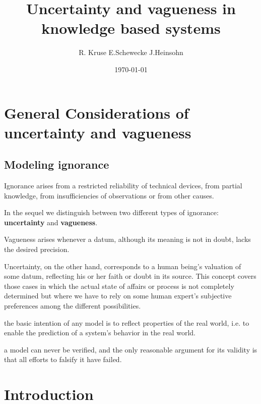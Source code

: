 \documentclass[11pt]{article}
\author{R. Kruse E.Schewecke J.Heinsohn}
\date{\today}
\title{Uncertainty and vagueness in knowledge based systems}
\begin{document}
\maketitle
\tableofcontents \clearpage\section{General Considerations of uncertainty and vagueness}
\label{sec:orgabc4af6}
\subsection{Modeling ignorance}
\label{sec:orgb9a4f31}
Ignorance arises from a restricted reliability of technical devices, from
partial knowledge, from insufficiencies of observations or from other causes. 

In the sequel we distinguish between two different types of ignorance:
\textbf{uncertainty} and \textbf{vagueness}.  

Vagueness arises whenever a datum, although its meaning is not in doubt,
lacks the desired precision. 

Uncertainty, on the other hand, corresponds to a
human being's valuation of some datum, reflecting his or her faith or doubt
in its source. This concept covers those cases in which the actual state of
affairs or process is not completely determined but where we have to rely on
some human expert's subjective preferences among the different possibilities. 

the basic intention of any model is to reflect properties of the real world,
i.e. to enable the prediction of a system's behavior in the real world. 

a model can never be verified, and the only reasonable argument for its
validity is that all efforts to falsify it have failed.
\section{Introduction}
\label{sec:org8ed5bbe}
\end{document}

